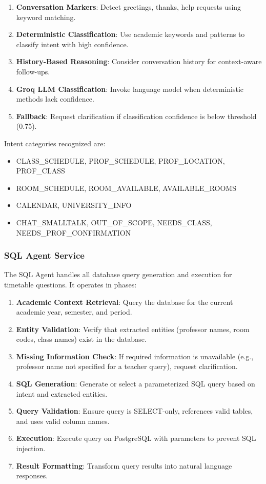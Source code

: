 \begin{enumerate}
    \item \textbf{Conversation Markers}: Detect greetings, thanks, help requests using keyword matching.
    \item \textbf{Deterministic Classification}: Use academic keywords and patterns to classify intent with high confidence.
    \item \textbf{History-Based Reasoning}: Consider conversation history for context-aware follow-ups.
    \item \textbf{Groq LLM Classification}: Invoke language model when deterministic methods lack confidence.
    \item \textbf{Fallback}: Request clarification if classification confidence is below threshold (0.75).
\end{enumerate}

Intent categories recognized are:

\begin{itemize}
    \item CLASS\_SCHEDULE, PROF\_SCHEDULE, PROF\_LOCATION, PROF\_CLASS
    \item ROOM\_SCHEDULE, ROOM\_AVAILABLE, AVAILABLE\_ROOMS
    \item CALENDAR, UNIVERSITY\_INFO
    \item CHAT\_SMALLTALK, OUT\_OF\_SCOPE, NEEDS\_CLASS, NEEDS\_PROF\_CONFIRMATION
\end{itemize}

\subsubsection{SQL Agent Service}
The SQL Agent handles all database query generation and execution for timetable questions. It operates in phases:

\begin{enumerate}
    \item \textbf{Academic Context Retrieval}: Query the database for the current academic year, semester, and period.
    \item \textbf{Entity Validation}: Verify that extracted entities (professor names, room codes, class names) exist in the database.
    \item \textbf{Missing Information Check}: If required information is unavailable (e.g., professor name not specified for a teacher query), request clarification.
    \item \textbf{SQL Generation}: Generate or select a parameterized SQL query based on intent and extracted entities.
    \item \textbf{Query Validation}: Ensure query is SELECT-only, references valid tables, and uses valid column names.
    \item \textbf{Execution}: Execute query on PostgreSQL with parameters to prevent SQL injection.
    \item \textbf{Result Formatting}: Transform query results into natural language responses.
\end{enumerate}

